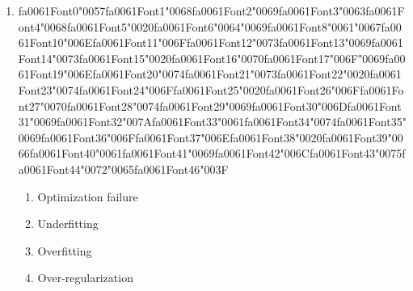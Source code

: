 \documentclass[12pt]{article}
\begin{document}
\begin{enumerate}[label=Q\arabic*.]
 \item {\csname fa0061Font0\endcsname\char"0057}{\csname fa0061Font1\endcsname\char"0068}{\csname fa0061Font2\endcsname\char"0069}{\csname fa0061Font3\endcsname\char"0063}{\csname fa0061Font4\endcsname\char"0068}{\csname fa0061Font5\endcsname\char"0020}{\csname fa0061Font6\endcsname\char"0064}{\char"0069}{\csname fa0061Font8\endcsname\char"0061}{\char"0067}{\csname fa0061Font10\endcsname\char"006E}{\csname fa0061Font11\endcsname\char"006F}{\csname fa0061Font12\endcsname\char"0073}{\csname fa0061Font13\endcsname\char"0069}{\csname fa0061Font14\endcsname\char"0073}{\csname fa0061Font15\endcsname\char"0020}{\csname fa0061Font16\endcsname\char"0070}{\csname fa0061Font17\endcsname\char"006F}{\char"0069}{\csname fa0061Font19\endcsname\char"006E}{\csname fa0061Font20\endcsname\char"0074}{\csname fa0061Font21\endcsname\char"0073}{\csname fa0061Font22\endcsname\char"0020}{\csname fa0061Font23\endcsname\char"0074}{\csname fa0061Font24\endcsname\char"006F}{\csname fa0061Font25\endcsname\char"0020}{\csname fa0061Font26\endcsname\char"006F}{\csname fa0061Font27\endcsname\char"0070}{\csname fa0061Font28\endcsname\char"0074}{\csname fa0061Font29\endcsname\char"0069}{\csname fa0061Font30\endcsname\char"006D}{\csname fa0061Font31\endcsname\char"0069}{\csname fa0061Font32\endcsname\char"007A}{\csname fa0061Font33\endcsname\char"0061}{\csname fa0061Font34\endcsname\char"0074}{\csname fa0061Font35\endcsname\char"0069}{\csname fa0061Font36\endcsname\char"006F}{\csname fa0061Font37\endcsname\char"006E}{\csname fa0061Font38\endcsname\char"0020}{\csname fa0061Font39\endcsname\char"0066}{\csname fa0061Font40\endcsname\char"0061}{\csname fa0061Font41\endcsname\char"0069}{\csname fa0061Font42\endcsname\char"006C}{\csname fa0061Font43\endcsname\char"0075}{\csname fa0061Font44\endcsname\char"0072}{\char"0065}{\csname fa0061Font46\endcsname\char"003F}
 \begin{enumerate}[label=(\Alph*)]
     \item Optimization failure
     \item Underfitting
     \item Overfitting
     \item Over-regularization
 \end{enumerate}
 

\end{enumerate}
\end{document}
